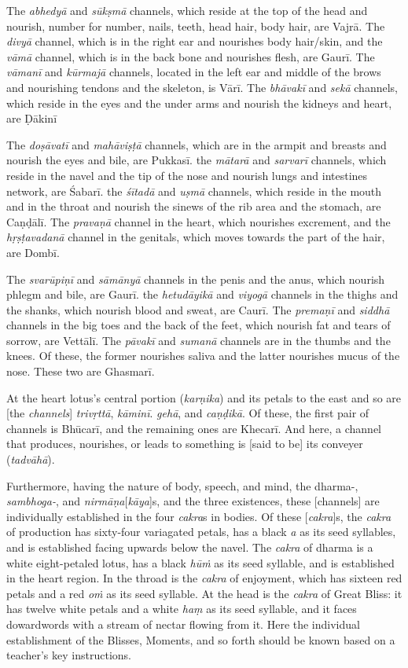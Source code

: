 \documentclass[naipra.tex]{subfiles}
\begin{document}
The \emph{abhedyā} and \emph{sūkṣmā} channels, which reside at the top of the head and nourish, number for number, nails, teeth, head hair, body hair, are Vajrā.
The \emph{divyā} channel, which is in the right ear and nourishes body hair/skin, and the \emph{vāmā} channel, which is in the back bone and nourishes flesh, are Gaurī.
The \emph{vāmanī} and \emph{kūrmajā} channels, located in the left ear and middle of the brows and nourishing tendons and the skeleton, is Vārī.
The \emph{bhāvakī} and \emph{sekā} channels, which reside in the eyes and the under arms and nourish the kidneys and heart, are Ḍākinī

The \emph{doṣāvatī} and \emph{mahāviṣṭā} channels, which are in the armpit and breasts and nourish the eyes and bile, are Pukkasī.
the \emph{mātarā} and \emph{sarvarī} channels, which reside in the navel and the tip of the nose and nourish lungs and intestines network, are Śabarī.
the \emph{śītadā} and \emph{uṣmā} channels, which reside in the mouth and in the throat and nourish the sinews of the rib area and the stomach, are Caṇḍālī.
The \emph{pravaṇā} channel in the heart, which nourishes excrement, and the \emph{hṛṣṭavadanā} channel in the genitals, which moves towards the part of the hair, are Dombī.

The \emph{svarūpiṇī} and \emph{sāmānyā} channels in the penis and the anus, which nourish phlegm and bile, are Gaurī.
the \emph{hetudāyikā} and \emph{viyogā} channels in the thighs and the shanks, which nourish blood and sweat, are Caurī.
The \emph{premaṇī} and \emph{siddhā} channels in the big toes and the back of the feet, which nourish fat and tears of sorrow, are Vettālī.
The \emph{pāvakī} and \emph{sumanā} channels are in the thumbs and the knees.
Of these, the former nourishes saliva and the latter nourishes mucus of the nose.
These two are Ghasmarī.

At the heart lotus's central portion (\emph{karṇika}) and its petals to the east and so are [the \emph{channels}] \emph{trivṛttā}, \emph{kāminī}. \emph{gehā}, and \emph{caṇḍikā}.
Of these, the first pair of channels is Bhūcarī, and the remaining ones are Khecarī.
And here, a channel that produces, nourishes, or leads to something is [said to be] its conveyer (\emph{tadvāhā}).

Furthermore, having the nature of body, speech, and mind, the dharma-, \emph{sambhoga-}, and \emph{nirmāṇa}[\emph{kāya}]s, and the three existences, these [channels] are individually established in the four \emph{cakra}s in bodies.
Of these [\emph{cakra}]s, the \emph{cakra} of production has sixty-four variagated petals, has a black \emph{a} as its seed syllables, and is established facing upwards below the navel.
The \emph{cakra} of dharma is a white eight-petaled lotus, has a black \emph{hūṁ} as its seed syllable, and is established in the heart region.
In the throad is the \emph{cakra} of enjoyment, which has sixteen red petals and a red \emph{oṁ} as its seed syllable.
At the head is the \emph{cakra} of Great Bliss: it has twelve white petals and a white \emph{haṃ} as its seed syllable, and it faces dowardwords with a stream of nectar flowing from it.
Here the individual establishment of the Blisses, Moments, and so forth should be known based on a teacher's key instructions.
\end{document}
